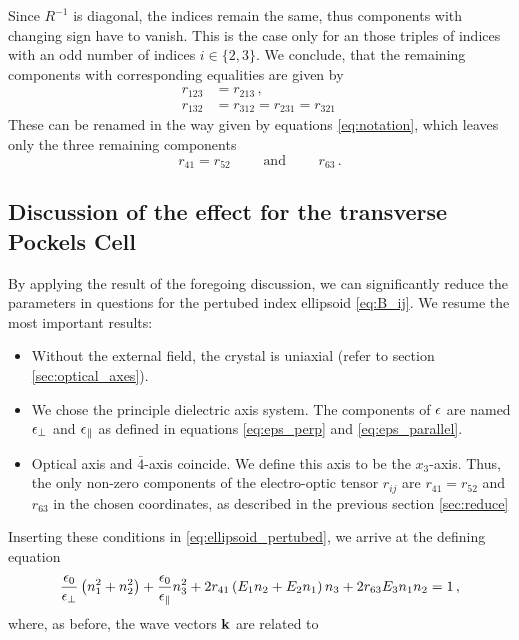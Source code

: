 Since $R^{-1}$ is diagonal, the indices remain the same, thus 
components with changing sign have to vanish. This is the case 
only for an those triples of indices with an 
odd number of indices $i \in \{2, 3\}$. We conclude, that 
the remaining components with corresponding equalities are given by
\begin{align*}
    r_{123} &=  r_{213}\, , \\
    r_{132} &=  r_{312} = r_{231} = r_{321}\,
\end{align*}
These can be renamed in the way given by equations \eqref{eq:notation}, 
which leaves only the three remaining components
\begin{equation}
    r_{41} = r_{52} \qquad \text{ and } \qquad  r_{63}\, .
\end{equation}

\subsection{Discussion of the effect for the transverse Pockels Cell}
By applying the result of the foregoing discussion, we can significantly 
reduce the parameters in questions for the pertubed index ellipsoid
\eqref{eq:B_ij}. We resume the most important results:
\begin{itemize}
    \item
    Without the external field, the crystal is uniaxial 
    (refer to section \ref{sec:optical_axes}).
    \item
    We chose the principle dielectric axis system. The 
    components of $\epsilon$ are named $\epsilon_\perp$ and 
    $\epsilon_\parallel$ as defined in equations 
    \eqref{eq:eps_perp} and \eqref{eq:eps_parallel}.  
    \item
    Optical axis and $\bar{4}$-axis coincide. We define 
    this axis to be the $x_3$-axis. Thus, the 
    only non-zero components of the electro-optic tensor 
    $r_{ij}$ are $r_{41} = r_{52}$ and $r_{63}$ in the 
    chosen coordinates, as described in the previous section 
    \ref{sec:reduce}
\end{itemize}
Inserting these conditions in \eqref{eq:ellipsoid_pertubed}, 
we arrive at the defining equation
\begin{equation}
    \frac{\epsilon_0}{\epsilon_\perp}\left(n_1^2 + n_2^2\right) + 
    \frac{\epsilon_0}{\epsilon_\parallel} n_3^2 + 
    2 r_{41} \left(E_1 n_2 + E_2 n_1\right)n_3 + 
    2 r_{63} E_3 n_1 n_2  = 1\, ,
    \label{eq:ellipsoid_red}
\end{equation}
where, as before, the wave vectors $\mathbf{k}$ are related to 
